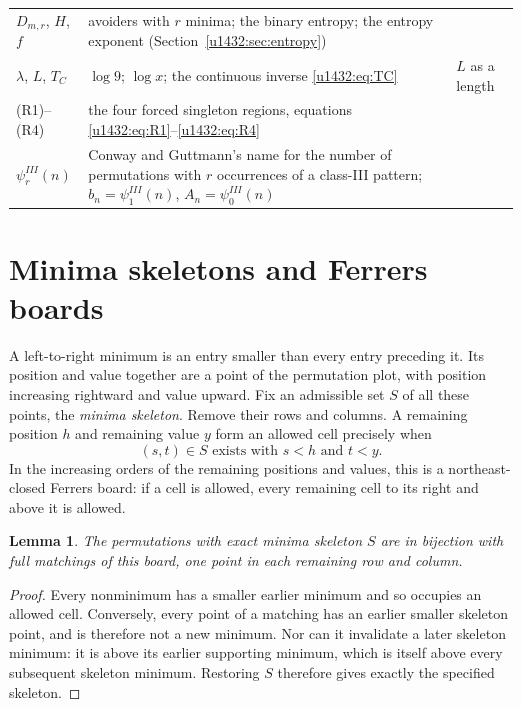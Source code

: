\documentclass[11pt]{article}
\newtheorem{lemma}[theorem]{Lemma}
\theoremstyle{remark}\newtheorem{remark}[theorem]{Remark}
\begin{document}
\begin{minipage}{\textwidth}
\begin{tabular}{@{}>{\raggedright\arraybackslash}p{0.75in}>{\raggedright\arraybackslash}p{3.45in}>{\raggedright\arraybackslash}p{1.95in}@{}}
$D_{m,r}$, $H$, $f$ & avoiders with $r$ minima; the binary entropy; the
 entropy exponent (Section~\ref{u1432:sec:entropy}) & \\
$\lambda$, $L$, $T_C$ & $\log9$; $\log x$; the continuous inverse
 \eqref{u1432:eq:TC} & $L$ as a length\\
(R1)--(R4) & the four forced singleton regions, equations
 \eqref{u1432:eq:R1}--\eqref{u1432:eq:R4} & \\
$\psi^{III}_r(n)$ & Conway and Guttmann's name for the number of
 permutations with $r$ occurrences of a class-III pattern; $b_n=\psi^{III}_1(n)$,
 $A_n=\psi^{III}_0(n)$ & \\
\bottomrule
\end{tabular}
\endgroup
\end{minipage}

\section{Minima skeletons and Ferrers boards}\label{u1432:sec:board}
A left-to-right minimum is an entry smaller than every entry preceding it.
Its position and value together are a point of the permutation plot, with
position increasing rightward and value upward. Fix an admissible set
$S$ of all these points, the \emph{minima skeleton}. Remove their rows and
columns. A remaining position $h$ and remaining value $y$ form an allowed
cell precisely when
\begin{equation}\label{u1432:eq:allowed}
 (s,t)\in S\text{ exists with }s<h\text{ and }t<y.
\end{equation}
In the increasing orders of the remaining positions and values, this is a
northeast-closed Ferrers board: if a cell is allowed, every remaining cell
to its right and above it is allowed.

\begin{lemma}\label{u1432:lem:skeleton}
The permutations with exact minima skeleton $S$ are in bijection with
full matchings of this board, one point in each remaining row and column.
\end{lemma}
\begin{proof}
Every nonminimum has a smaller earlier minimum and so occupies an allowed
cell. Conversely, every point of a matching has an earlier smaller
skeleton point, and is therefore not a new minimum. Nor can it invalidate
a later skeleton minimum: it is above its earlier supporting minimum,
which is itself above every subsequent skeleton minimum. Restoring $S$
therefore gives exactly the specified skeleton.
\end{proof}
\end{document}
